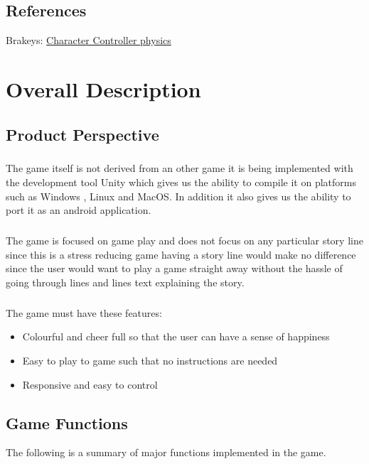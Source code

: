 \section{References}
 Brakeys: \href{https://github.com/Brackeys/2D-Character-Controller}{Character Controller physics}


\chapter{Overall Description}
\label{Overall Description}

\section{Product Perspective}
\paragraph{}The game itself is not derived from an other game it is being implemented with the development tool Unity which gives us the ability to compile it on platforms such as Windows , Linux and MacOS. In addition it also gives us the ability to port it as an android application.

\paragraph{}The game is focused on game play and does not focus on any particular story line since this is a stress reducing game having a story line would make no difference since the user would want to play a game straight away without the hassle of going through lines and lines text explaining the story.

\paragraph{} The game must have these features:
\begin{itemize}
    \item Colourful and cheer full so that the user can have a sense of happiness 
    \item Easy to play to game such that no instructions are needed 
    \item Responsive and easy to control  
\end{itemize}
\section{Game Functions}
The following is a summary of major functions implemented in the game.
